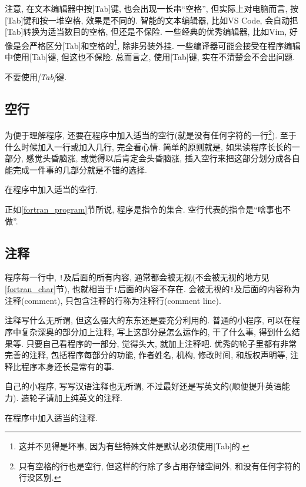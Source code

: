 注意, 在文本编辑器中按[Tab]键, 也会出现一长串``空格'', 但实际上对电脑而言, 按[Tab]键和按一堆空格, 效果是不同的. 智能的文本编辑器, 比如VS Code, 会自动把[Tab]转换为适当数目的空格, 但还是不保险. 一些经典的优秀编辑器, 比如Vim, 好像是会严格区分[Tab]和空格的\footnote{
    这并不见得是坏事, 因为有些特殊文件是默认必须使用[Tab]的.
}, 除非另装外挂. 一些编译器可能会接受在程序编辑中使用[Tab]键, 但这也不保险. 总而言之, 使用[Tab]键, 实在不清楚会不会出问题.

\begin{principle}
    不要使用\emph{[Tab]}键.
\end{principle}

\subsection{空行}

为便于理解程序, 还要在程序中加入适当的空行(就是没有任何字符的一行\footnote{
    只有空格的行也是空行, 但这样的行除了多占用存储空间外, 和没有任何字符的行没区别.
}). 至于什么时候加入一行或加入几行, 完全看心情. 简单的原则就是, 如果读程序长长的一部分, 感觉头昏脑涨, 或觉得以后肯定会头昏脑涨, 插入空行来把这部分划分成各自能完成一件事的几部分就是不错的选择.

\begin{principle}
    在程序中加入适当的空行.
\end{principle}

正如\ref{fortran_program}节所说, 程序是指令的集合. 空行代表的指令是``啥事也不做''.

\subsection{注释}

程序每一行中, \verb|!|及后面的所有内容, 通常都会被无视(不会被无视的地方见\ref{fortran_char}节), 也就相当于\verb|!|后面的内容不存在. 会被无视的\verb|!|及后面的内容称为注释(comment), 只包含注释的行称为注释行(comment line).

注释写什么无所谓, 但这么强大的东东还是要充分利用的. 普通的小程序, 可以在程序中复杂深奥的部分加上注释, 写上这部分是怎么运作的, 干了什么事, 得到什么结果等. 只要自己看程序的一部分, 觉得头大, 就加上注释吧. 优秀的轮子里都有非常完善的注释, 包括程序每部分的功能, 作者姓名, 机构, 修改时间, 和版权声明等, 注释比程序本身还长是常有的事.

自己的小程序, 写写汉语注释也无所谓, 不过最好还是写英文的(顺便提升英语能力). 造轮子请加上纯英文的注释.

\begin{principle}
    在程序中加入适当的注释.
\end{principle}

